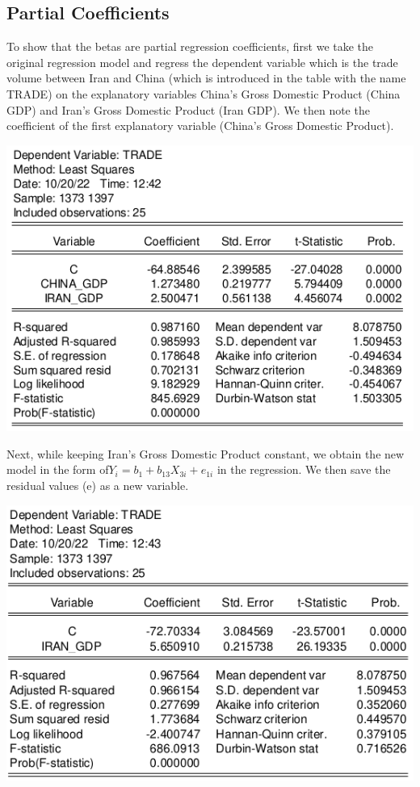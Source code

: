 \documentclass[12pt, letterpaper, twoside]{article}
\begin{document}
\subsection{Partial Coefficients}
To show that the betas are partial regression coefficients, first we take the original regression model and regress the dependent variable which is the trade volume between Iran and China (which is introduced in the table with the name TRADE) on the explanatory variables China's Gross Domestic Product (China GDP) and Iran's Gross Domestic Product (Iran GDP). We then note the coefficient of the first explanatory variable (China's Gross Domestic Product).

    \includegraphics[width=.8\textwidth,height=.8\textwidth,keepaspectratio,center]{1.png} 

Next, while keeping Iran's Gross Domestic Product constant, we obtain the new model in the form of\(Y_{i}=b_{1}+b_{13}X_{3i}+e_{1i}\) in the regression. We then save the residual values (e) as a new variable.

    \includegraphics[width=.8\textwidth,height=.8\textwidth,keepaspectratio,center]{2.png}
\end{document}
